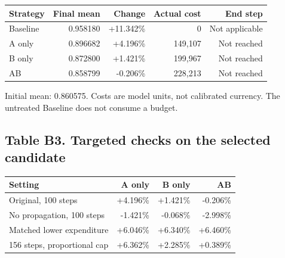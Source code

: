 \documentclass[a4paper,11pt]{article}
\begin{document}
\begin{center}\renewcommand{\arraystretch}{1.15}\begin{tabular}{@{}lrrrr@{}}\toprule

Strategy & Final mean & Change & Actual cost & End step \\

\midrule

Baseline & 0.958180 & +11.342\% & 0 & Not applicable \\

A only & 0.896682 & +4.196\% & 149,107 & Not reached \\

B only & 0.872800 & +1.421\% & 199,967 & Not reached \\

AB & 0.858799 & -0.206\% & 228,213 & Not reached \\

\bottomrule\end{tabular}\end{center}

Initial mean: 0.860575. Costs are model units, not calibrated currency. The untreated Baseline does not consume a budget.

\clearpage

\subsection*{Table B3. Targeted checks on the selected candidate}

\begin{center}\renewcommand{\arraystretch}{1.15}\begin{tabular}{@{}lrrr@{}}\toprule

Setting & A only & B only & AB \\

\midrule

Original, 100 steps & +4.196\% & +1.421\% & -0.206\% \\

No propagation, 100 steps & -1.421\% & -0.068\% & -2.998\% \\

Matched lower expenditure & +6.046\% & +6.340\% & +6.460\% \\

156 steps, proportional cap & +6.362\% & +2.285\% & +0.389\% \\

\bottomrule\end{tabular}\end{center}
\end{document}
